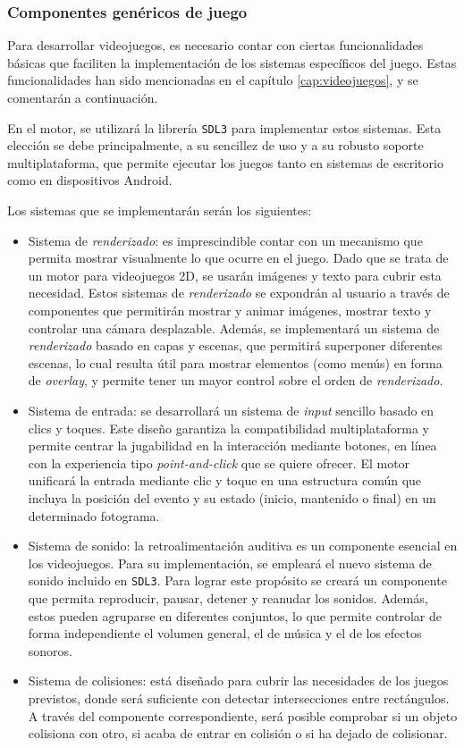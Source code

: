 \subsubsection{Componentes genéricos de juego}
Para desarrollar videojuegos, es necesario contar con ciertas funcionalidades básicas que faciliten la implementación de los sistemas específicos del juego. Estas funcionalidades han sido mencionadas en el capítulo \ref{cap:videojuegos}, y se comentarán a continuación.

\smallskip

En el motor, se utilizará la librería \texttt{SDL3} para implementar estos sistemas. Esta elección se debe principalmente, a su sencillez de uso y a su robusto soporte multiplataforma, que permite ejecutar los juegos tanto en sistemas de escritorio como en dispositivos Android.

\medskip

Los sistemas que se implementarán serán los siguientes:
\begin{itemize}
	\item Sistema de \textit{renderizado}: es imprescindible contar con un mecanismo que permita mostrar visualmente lo que ocurre en el juego. Dado que se trata de un motor para videojuegos 2D, se usarán imágenes y texto para cubrir esta necesidad. Estos sistemas de \textit{renderizado} se expondrán al usuario a través de componentes que permitirán mostrar y animar imágenes, mostrar texto y controlar una cámara desplazable. Además, se implementará un sistema de \textit{renderizado} basado en capas y escenas, que permitirá superponer diferentes escenas, lo cual resulta útil para mostrar elementos (como menús) en forma de \textit{overlay}, y permite tener un mayor control sobre el orden de \textit{renderizado}.
	\item Sistema de entrada: se desarrollará un sistema de \textit{input} sencillo basado en clics y toques. Este diseño garantiza la compatibilidad multiplataforma y permite centrar la jugabilidad en la interacción mediante botones, en línea con la experiencia tipo \textit{point-and-click} que se quiere ofrecer. El motor unificará la entrada mediante clic y toque en una estructura común que incluya la posición del evento y su estado (inicio, mantenido o final) en un determinado fotograma.
	\item Sistema de sonido: la retroalimentación auditiva es un componente esencial en los videojuegos. Para su implementación, se empleará el nuevo sistema de sonido incluido en \texttt{SDL3}. Para lograr este propósito se creará un componente que permita reproducir, pausar, detener y reanudar los sonidos. Además, estos pueden agruparse en diferentes conjuntos, lo que permite controlar de forma independiente el volumen general, el de música y el de los efectos sonoros.
	\item Sistema de colisiones: está diseñado para cubrir las necesidades de los juegos previstos, donde será suficiente con detectar intersecciones entre rectángulos. A través del componente correspondiente, será posible comprobar si un objeto colisiona con otro, si acaba de entrar en colisión o si ha dejado de colisionar.
\end{itemize}

